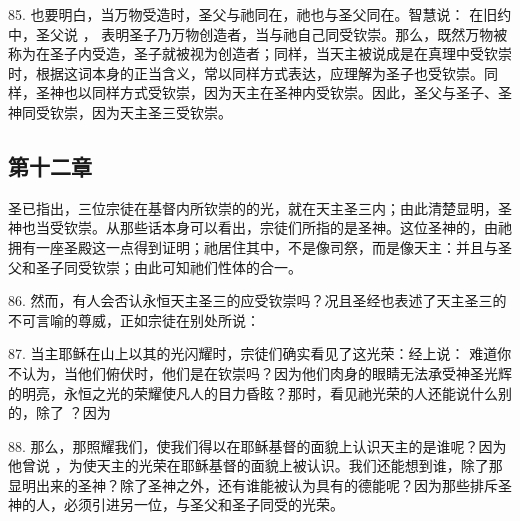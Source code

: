 85. 也要明白，当万物受造时，圣父与祂同在，祂也与圣父同在。智慧说： 在旧约中，圣父说 ， 表明圣子乃万物创造者，当与祂自己同受钦崇。那么，既然万物被称为在圣子内受造，圣子就被视为创造者；同样，当天主被说成是在真理中受钦崇时，根据这词本身的正当含义，常以同样方式表达，应理解为圣子也受钦崇。同样，圣神也以同样方式受钦崇，因为天主在圣神内受钦崇。因此，圣父与圣子、圣神同受钦崇，因为天主圣三受钦崇。\par


\subsection{第十二章}

圣已指出，三位宗徒在基督内所钦崇的的光，就在天主圣三内；由此清楚显明，圣神也当受钦崇。从那些话本身可以看出，宗徒们所指的是圣神。这位圣神的，由祂拥有一座圣殿这一点得到证明；祂居住其中，不是像司祭，而是像天主：并且与圣父和圣子同受钦崇；由此可知祂们性体的合一。\par

86. 然而，有人会否认永恒天主圣三的应受钦崇吗？况且圣经也表述了天主圣三的不可言喻的尊威，正如宗徒在别处所说：\par

87. 当主耶稣在山上以其的光闪耀时，宗徒们确实看见了这光荣：经上说： 难道你不认为，当他们俯伏时，他们是在钦崇吗？因为他们肉身的眼睛无法承受神圣光辉的明亮，永恒之光的荣耀使凡人的目力昏眩？那时，看见祂光荣的人还能说什么别的，除了 ？因为 \par

88. 那么，那照耀我们，使我们得以在耶稣基督的面貌上认识天主的是谁呢？因为他曾说 ，为使天主的光荣在耶稣基督的面貌上被认识。我们还能想到谁，除了那显明出来的圣神？除了圣神之外，还有谁能被认为具有的德能呢？因为那些排斥圣神的人，必须引进另一位，与圣父和圣子同受的光荣。\par

